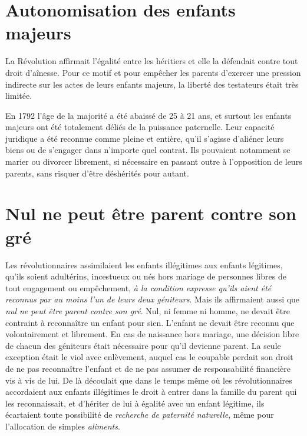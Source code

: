  


\section{Autonomisation des enfants majeurs}

 La Révolution affirmait l'égalité entre les héritiers et elle la défendait contre tout droit d'aînesse. Pour ce motif et pour empêcher les parents d'exercer une pression indirecte sur les actes de leurs enfants majeurs, la liberté des testateurs était très limitée.
 
 En 1792 l'âge de la majorité a été abaissé de 25 à 21 ans, et surtout les enfants majeurs ont été totalement déliés de la puissance paternelle. Leur capacité juridique a été reconnue comme pleine et entière, qu'il s'agisse d'aliéner leurs biens ou de s'engager dans n'importe quel contrat. Ils pouvaient notamment se marier ou divorcer librement, si nécessaire en passant outre à l'opposition de leurs parents, sans risquer d'être déshérités pour autant. 

 


\section{Nul ne peut être parent contre son gré}

 Les révolutionnaires assimilaient les enfants illégitimes aux enfants légitimes, qu'ils soient adultérins, incestueux ou nés hors mariage de personnes libres de tout engagement ou empêchement, \emph{à la condition expresse qu'ils aient été reconnus par au moins l'un de leurs deux géniteurs}. 
 Mais ils affirmaient aussi que \emph{nul ne peut être parent contre son gré}. Nul, ni femme ni homme, ne devait être contraint à reconnaître un enfant pour sien. L'enfant ne devait être reconnu que volontairement et librement. En cas de naissance hors mariage, une décision libre de chacun des géniteurs était nécessaire pour qu'il devienne parent. La seule exception était le viol avec enlèvement, auquel cas le coupable perdait son droit de ne pas reconnaître l'enfant et de ne pas assumer de responsabilité financière vis à vis de lui. 
De là découlait que dans le temps même où les révolutionnaires accordaient aux enfants illégitimes le droit à entrer dans la famille du parent qui les reconnaissait, et d'hériter de lui à égalité avec un enfant légitime, ils écartaient toute possibilité de \emph{recherche de paternité naturelle}, même pour l'allocation de simples \emph{aliments}. 
 
